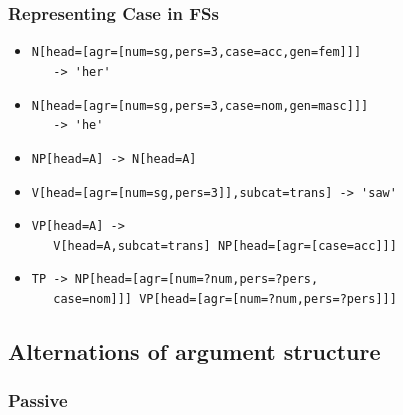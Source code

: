 \documentclass{beamer}
\begin{document}
\begin{frame}[fragile]

\frametitle{Representing Case in FSs}



\begin{itemize}

\small

\item \verb+N[head=[agr=[num=sg,pers=3,case=acc,gen=fem]]]+ \\ \verb+   -> 'her'+

\item \verb+N[head=[agr=[num=sg,pers=3,case=nom,gen=masc]]]+ \\ \verb+   -> 'he'+

\item \verb+NP[head=A] -> N[head=A]+

\item \pause \verb+V[head=[agr=[num=sg,pers=3]],subcat=trans] -> 'saw'+

\item \verb+VP[head=A] ->+ \\ \verb+   V[head=A,subcat=trans] NP[head=[agr=[case=acc]]]+

\item \pause \verb+TP -> NP[head=[agr=[num=?num,pers=?pers,+ \\ \verb+   case=nom]]] VP[head=[agr=[num=?num,pers=?pers]]]+

\end{itemize}

\end{frame}





\subsection{Alternations of argument structure}

\subsubsection{Passive}
\end{document}
